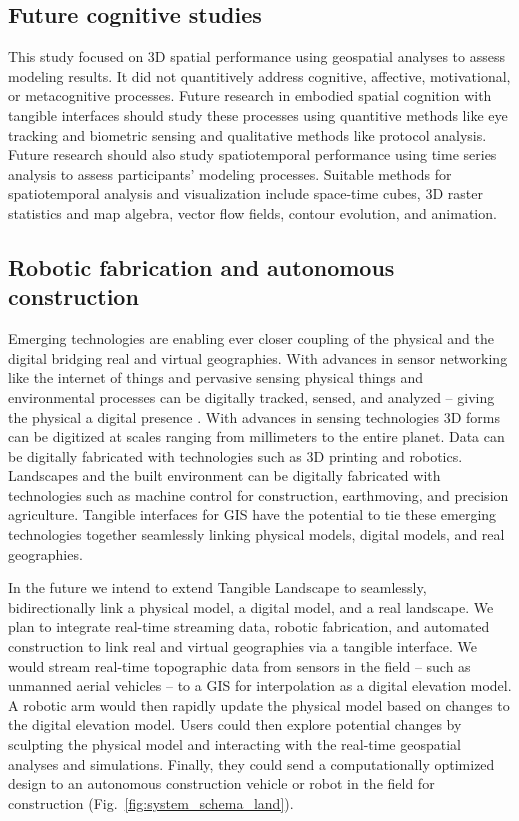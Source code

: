\documentclass[prodmode,acmtochi]{acmsmall} %
\begin{document}
\subsection{Future cognitive studies}
\label{cog_sci}
%
This study focused on 3D spatial performance
using geospatial analyses to assess modeling results. 
%
It did not quantitively address 
cognitive, affective, motivational, or metacognitive processes. 
%
Future research in embodied spatial cognition with tangible interfaces 
should study these processes using quantitive methods like 
eye tracking and biometric sensing 
and qualitative methods like protocol analysis.  
%
Future research should also study spatiotemporal performance
using time series analysis to assess participants' modeling processes.
%
Suitable methods for spatiotemporal analysis and visualization include 
space-time cubes, 3D raster statistics and map algebra, 
vector flow fields, contour evolution, and animation.

\subsection{Robotic fabrication and autonomous construction}
\label{robotic_fab}
%
Emerging technologies are enabling ever closer coupling 
of the physical and the digital 
bridging real and virtual geographies. 
%
With advances in sensor networking like 
the internet of things and pervasive sensing 
physical things and environmental processes
can be digitally tracked, sensed, and analyzed  
-- giving the physical a digital presence \cite{Ratti2009,Resch2011}. 
%
With advances in sensing technologies
3D forms can be digitized at scales ranging from millimeters to the entire planet.
%
Data can be digitally fabricated with technologies such as 3D printing and robotics. 
%
Landscapes and the built environment can be digitally fabricated 
with technologies such as machine control 
for construction, earthmoving, and precision agriculture.
%
Tangible interfaces for GIS have the potential to 
tie these emerging technologies together 
seamlessly linking physical models, digital models, and real geographies. 

In the future we intend to extend Tangible Landscape to 
seamlessly, bidirectionally link 
a physical model, a digital model, and a real landscape.
%
We plan to integrate real-time streaming data, 
robotic fabrication, 
and automated construction 
to link real and virtual geographies via a tangible interface. 
%
We would stream real-time topographic data 
from sensors in the field -- such as unmanned aerial vehicles --
to a GIS for interpolation as a digital elevation model. 
%
A robotic arm would then rapidly update the physical model 
based on changes to the digital elevation model. 
%
Users could then explore potential changes by sculpting the physical model
and interacting with the real-time geospatial analyses and simulations. 
Finally, they could send a computationally optimized design 
to an autonomous construction vehicle or robot in the field for construction 
(Fig.~\ref{fig:system_schema_land}). 
\end{document}
